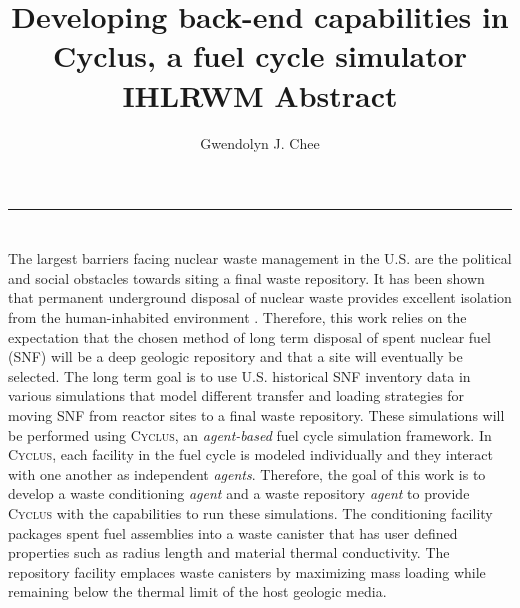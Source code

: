 \documentclass[11pt, letterpaper]{article}
\title{Developing back-end capabilities in Cyclus, a fuel cycle simulator
        \\ \vspace{0.5em} IHLRWM Abstract}
\author{Gwendolyn J. Chee}
\renewcommand *\footnoterule{}
\begin{document}
	\maketitle
	\hrule

\section * {}
\doublespacing
The largest barriers facing nuclear waste management in the U.S. 
are the political and social obstacles towards siting a final 
waste repository. 
It has been shown that permanent underground disposal of nuclear 
waste provides excellent isolation from the human-inhabited 
environment \cite{rechard_evolution_2014}. 
Therefore, this work relies on the expectation that the chosen 
method of long term disposal of spent nuclear fuel (SNF) will be 
a deep geologic repository and that a site will eventually be selected.
The long term goal is to use U.S. historical SNF inventory data 
\cite{peterson_unf-st&dards_2017} in various simulations that model 
different transfer and loading strategies for moving SNF from reactor 
sites to a final waste repository.  
These simulations will be performed using \textsc{Cyclus}, an \textit{agent-based} 
fuel cycle simulation framework. In \textsc{Cyclus}, each facility in 
the fuel cycle is modeled individually and they interact with one another 
as independent \textit{agents}. 
Therefore, the goal of this work is to develop a waste conditioning \textit{agent} 
and a waste repository \textit{agent} to provide \textsc{Cyclus} with the capabilities 
to run these simulations. 
The conditioning facility packages spent fuel assemblies into a waste 
canister that has user defined properties such as radius length and material 
thermal conductivity. 
The repository facility emplaces waste canisters by 
maximizing mass loading while remaining below the thermal 
limit of the host geologic media. 



\end{document}
